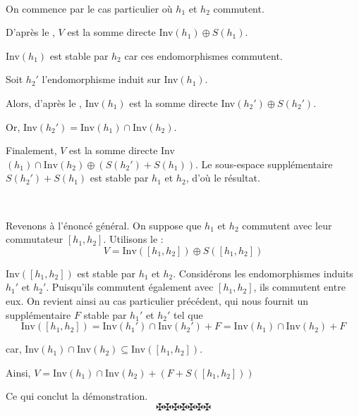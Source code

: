 \

On commence par le cas particulier o{\`u} $h_1$ et $h_2$ commutent.

D'apr{\`e}s le , $V$ est la somme directe Inv$(h_1) \oplus
S (h_1)$.

Inv$(h_1)$ est stable par $h_2$ car ces endomorphismes commutent.

Soit $h_2'$ l'endomorphisme induit sur Inv$(h_1)$.

Alors, d'apr{\`e}s le , Inv$(h_1)$ est la somme directe
Inv$(h_2') \oplus S (h_2')$.

Or, Inv$(h_2') = \text{Inv} (h_1) \cap \text{Inv} (h_2)$.

Finalement, $V$ est la somme directe Inv$(h_1) \cap \text{Inv} (h_2) \oplus
(S (h_2') + S (h_1))$. Le sous-espace suppl{\'e}mentaire $S (h_2') + S (h_1)$
est stable par $h_1$ et $h_2$, d'o{\`u} le r{\'e}sultat.

\

Revenons {\`a} l'{\'e}nonc{\'e} g{\'e}n{\'e}ral. On suppose que $h_1$ et
$h_2$ commutent avec leur commutateur $[h_1, h_2]$. Utilisons le
 :
\[ V = \text{Inv} ([h_1, h_2]) \oplus S ([h_1, h_2]) \]


Inv$([h_1, h_2])$ est stable par $h_1$ et $h_2$. Consid{\'e}rons les
endomorphismes induits $h_1'$ et $h_2'$. Puisqu'ils commutent {\'e}galement
avec $[h_1, h_2]$, ils commutent entre eux. On revient ainsi au cas
particulier pr{\'e}c{\'e}dent, qui nous fournit un suppl{\'e}mentaire $F$
stable par $h_1'$ et $h_2'$ tel que
\[ \text{Inv$([h_1, h_2]) = \text{Inv} (h_1') \cap \text{Inv} (h_2') + F =
   \text{Inv} (h_1) \cap \text{Inv} (h_2) + F$} \]


car, Inv$(h_1) \cap \text{Inv} (h_2) \subseteq \text{Inv} ([h_1, h_2])$.

Ainsi, $V = \text{Inv} (h_1) \cap \text{Inv} (h_2) + (F + S ([h_1, h_2]))$

Ce qui conclut la d{\'e}monstration.
\[ \maltese \maltese \maltese \maltese \maltese \maltese \maltese \]
